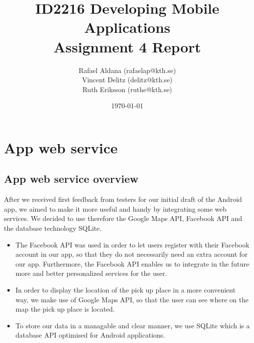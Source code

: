 \documentclass[11pt,twoside,a4paper]{report}
\begin{document}
\title{ID2216 Developing Mobile Applications\\Assignment 4 Report}
\author{Rafael Aldana (rafaelap@kth.se)\\Vincent Delitz (delitz@kth.se)\\Ruth Eriksson (ruthe@kth.se)}
\date{\today}
\maketitle



\tableofcontents
\thispagestyle{empty}



\renewcommand{\chaptername}{Assignment}
\setcounter{chapter}{3}


\chapter{App web service}
\label{assignment:app-web-service}

\section{App web service overview}

After we received first feedback from testers for our initial draft of the Android app, we aimed to make it more useful and handy by integrating some web services. We decided to use therefore the Google Maps API, Facebook API and the database technology SQLite. 

\begin{itemize}
\item The Facebook API was used in order to let users register with their Facebook account in our app, so that they do not necessarily need an extra account for our app. Furthermore, the Facebook API enables us to integrate in the future more and better personalized services for the user.

\item In order to display the location of the pick up place in a more convenient way, we make use of Google Maps API, so that the user can see where on the map the pick up place is located.

\item To store our data in a managable and clear manner, we use SQLite which is a database API optimised for Android applications.

\end{itemize}
\end{document}
